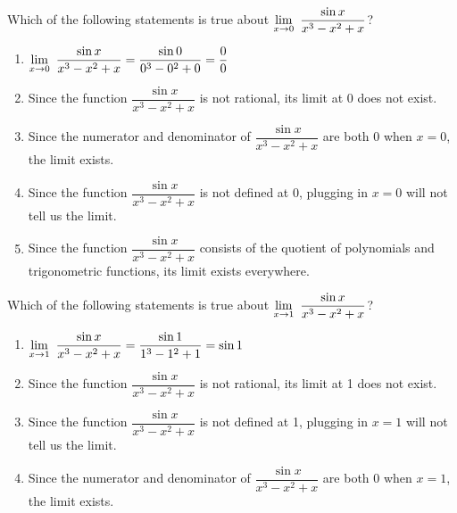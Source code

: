  \begin{frame}
Which of the following statements is true about $\displaystyle\lim_{x \to 0}~\dfrac{\sin x}{x^3-x^2+x}$? \vfill
\begin{enumerate}[A]
\item  $\displaystyle\lim_{x \to 0}~\dfrac{\sin x}{x^3-x^2+x} = \dfrac{\sin 0}{0^3-0^2+0}=\frac00$\vfill
\item Since the function $\dfrac{\sin x}{x^3-x^2+x}$ is not rational, its limit at 0 does not exist.\vfill
\item Since the numerator and denominator of  $\dfrac{\sin x}{x^3-x^2+x}$ are both 0 when $x=0$, the limit exists.\vfill
\item\alert<2|handout:0>{Since the function $\dfrac{\sin x}{x^3-x^2+x}$ is not defined at 0, plugging in $x=0$ will not tell us the limit.}\vfill
\item Since the function $\dfrac{\sin x}{x^3-x^2+x}$ consists of the quotient of polynomials and trigonometric functions, its limit exists everywhere.\vfill
\end{enumerate}
 \end{frame}
 \begin{frame}
Which of the following statements is true about $\displaystyle\lim_{x \to 1}~\frac{\sin x}{x^3-x^2+x}$? \vfill\vfill
\begin{enumerate}[A]
\item \alert<2|handout:0>{$\displaystyle\lim_{x \to 1}~\dfrac{\sin x}{x^3-x^2+x} = \frac{\sin 1}{1^3-1^2+1} = \sin 1$}\vfill
\item Since the function $\dfrac{\sin x}{x^3-x^2+x}$ is not rational, its limit at 1 does not exist.\vfill
\item Since the function $\dfrac{\sin x}{x^3-x^2+x}$ is not defined at 1, plugging in $x=1$ will not tell us the limit.\vfill
\item Since the numerator and denominator of  $\dfrac{\sin x}{x^3-x^2+x}$ are both 0 when $x=1$, the limit exists.
\end{enumerate}
 \end{frame}


